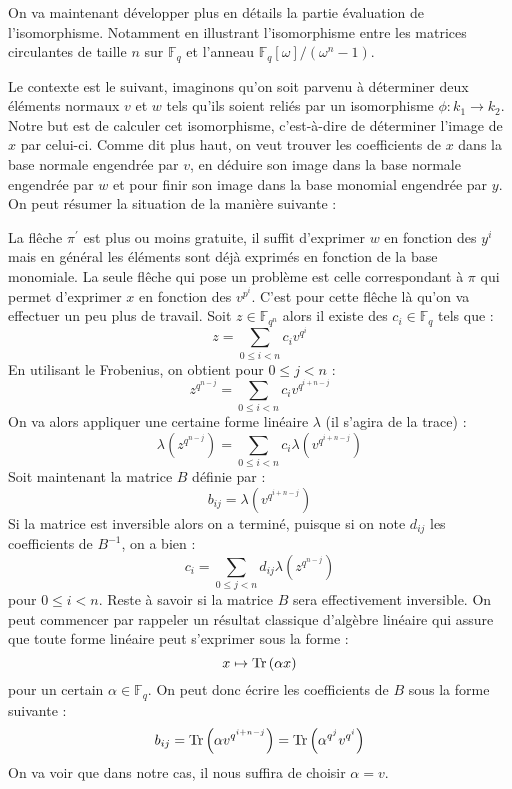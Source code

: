 \documentclass[a4paper]{article} %
\numberwithin{section}{part}
\numberwithin{equation}{section}
\newcommand\GF[1]{\mathbb{F}_{#1}}
\newcommand\Tr[1]{\textup{Tr}\left(#1\right)}
\begin{document}
On va maintenant développer plus en détails la partie évaluation de
l'isomorphisme. Notamment en illustrant l'isomorphisme entre les matrices
circulantes de taille $n$ sur $\GF{q}$ et l'anneau $\GF{q}[\omega]/(\omega^n -
1)$.\par
Le contexte est le suivant, imaginons qu'on soit parvenu à déterminer deux
éléments normaux $v$ et $w$ tels qu'ils soient reliés par un isomorphisme $\phi
: k_1\to k_2$. Notre but est de calculer cet isomorphisme, c'est-à-dire de
déterminer l'image de $x$ par celui-ci. Comme dit plus haut, on veut trouver les
coefficients de $x$ dans la base normale engendrée par $v$, en déduire son
image dans la base normale engendrée par $w$ et pour finir son image dans la 
base monomial engendrée par $y$. On peut résumer la situation de la manière 
suivante :
\begin{center}
\end{center}

La flêche $\pi^{\prime}$ est plus ou moins gratuite, il suffit d'exprimer $w$ en
fonction des $y^i$ mais en général les éléments sont déjà exprimés en fonction 
de la base monomiale. La seule flêche qui pose un problème est celle 
correspondant à $\pi$ qui permet d'exprimer $x$ en fonction des $v^{p^i}$. C'est
pour cette flêche là qu'on va effectuer un peu plus de travail.
Soit $z\in\GF{q^n}$ alors il existe des $c_i\in\GF{q}$ tels que :
\[z = \sum_{0 \leq i < n}{c_iv^{q^i}}\]
En utilisant le Frobenius, on obtient pour $0\leq j < n$ :
\[z^{q^{n-j}} = \sum_{0\leq i < n}{c_iv^{q^{i+n-j}}}\]
On va alors appliquer une certaine forme linéaire $\lambda$ (il s'agira de la 
trace) :
\[\lambda\left(z^{q^{n-j}}\right) = \sum_{0\leq i < n}
{c_i\lambda\left(v^{q^{i+n-j}}\right)}\]
Soit maintenant la matrice $B$ définie par :
\[b_{ij} = \lambda\left(v^{q^{i+n-j}}\right)\]
Si la matrice est inversible alors on a terminé, puisque si on note $d_{ij}$ les
coefficients de $B^{-1}$, on a bien :
\[c_i = \sum_{0\leq j < n}{d_{ij}\lambda\left(z^{q^{n-j}}\right)}\]
pour $0\leq i < n$. Reste à savoir si la matrice $B$ sera effectivement 
inversible.
On peut commencer par rappeler un résultat classique d'algèbre linéaire qui
assure que toute forme linéaire peut s'exprimer sous la forme :
\[x \mapsto \Tr{\alpha x}\]
pour un certain $\alpha\in\GF{q}$. On peut donc écrire les coefficients de $B$ 
sous la forme suivante :
\[b_{ij} = \Tr{\alpha v^{q^{i+n-j}}} = \Tr{\alpha^{q^j}v^{q^i}}\]
On va voir que dans notre cas, il nous suffira de choisir $\alpha = v$.
\end{document}
